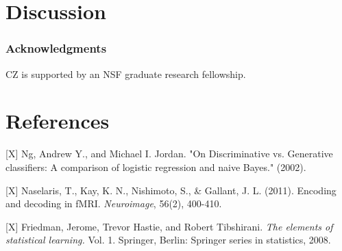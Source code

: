 \documentclass{article}
\begin{document}
\section{Discussion}


\subsubsection*{Acknowledgments}

CZ is supported by an NSF graduate research fellowship.

\section*{References}

\small

[X] Ng, Andrew Y., and Michael I. Jordan. "On Discriminative vs. Generative classifiers: A comparison of logistic regression and naive Bayes." (2002).

[X] Naselaris, T., Kay, K. N., Nishimoto, S., \& Gallant,
J. L. (2011). Encoding and decoding in fMRI. \emph{Neuroimage}, 56(2),
400-410.

[X] Friedman, Jerome, Trevor Hastie, and Robert Tibshirani. \emph{The elements
of statistical learning.} Vol. 1. Springer, Berlin: Springer series in
statistics, 2008.
\end{document}
